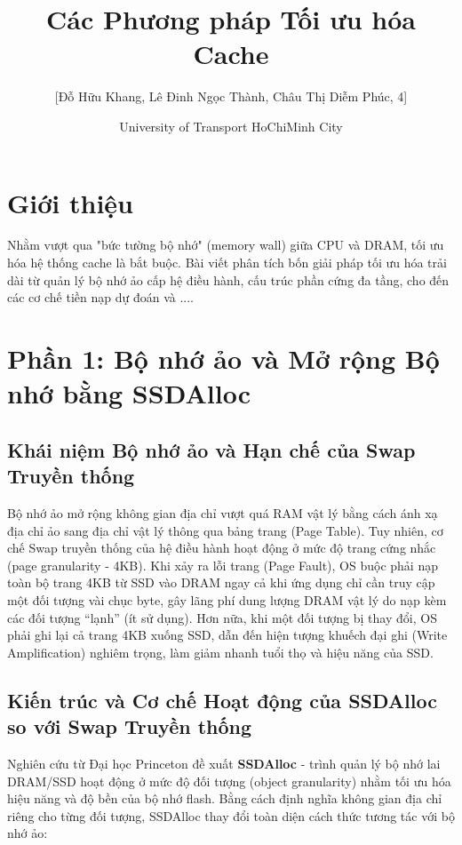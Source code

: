 \documentclass[10pt,twocolumn,a4paper]{article}
\title{\Large \textbf{Các Phương pháp Tối ưu hóa Cache}}
\author{[Đỗ Hữu Khang, Lê Đinh Ngọc Thành, Châu Thị Diễm Phúc, 4]}
\date{University of Transport HoChiMinh City}
\begin{document}
\maketitle

\section{Giới thiệu}

Nhằm vượt qua "bức tường bộ nhớ" (memory wall) giữa CPU và DRAM, tối ưu hóa hệ thống cache là bắt buộc. Bài viết phân tích bốn giải pháp tối ưu hóa trải dài từ quản lý bộ nhớ ảo cấp hệ điều hành, cấu trúc phần cứng đa tầng, cho đến các cơ chế tiền nạp dự đoán và ....

\section{Phần 1: Bộ nhớ ảo và Mở rộng Bộ nhớ bằng SSDAlloc}

\subsection{Khái niệm Bộ nhớ ảo và Hạn chế của Swap Truyền thống}
Bộ nhớ ảo mở rộng không gian địa chỉ vượt quá RAM vật lý bằng cách ánh xạ địa chỉ ảo sang địa chỉ vật lý thông qua bảng trang (Page Table). Tuy nhiên, cơ chế Swap truyền thống của hệ điều hành hoạt động ở mức độ trang cứng nhắc (page granularity - 4KB). Khi xảy ra lỗi trang (Page Fault), OS buộc phải nạp toàn bộ trang 4KB từ SSD vào DRAM ngay cả khi ứng dụng chỉ cần truy cập một đối tượng vài chục byte, gây lãng phí dung lượng DRAM vật lý do nạp kèm các đối tượng ``lạnh'' (ít sử dụng). Hơn nữa, khi một đối tượng bị thay đổi, OS phải ghi lại cả trang 4KB xuống SSD, dẫn đến hiện tượng khuếch đại ghi (Write Amplification) nghiêm trọng, làm giảm nhanh tuổi thọ và hiệu năng của SSD.

\subsection{Kiến trúc và Cơ chế Hoạt động của SSDAlloc so với Swap Truyền thống}
Nghiên cứu từ Đại học Princeton đề xuất \textbf{SSDAlloc} \cite{badam2011ssdalloc} - trình quản lý bộ nhớ lai DRAM/SSD hoạt động ở mức độ đối tượng (object granularity) nhằm tối ưu hóa hiệu năng và độ bền của bộ nhớ flash. Bằng cách định nghĩa không gian địa chỉ riêng cho từng đối tượng, SSDAlloc thay đổi toàn diện cách thức tương tác với bộ nhớ ảo:
\end{document}
